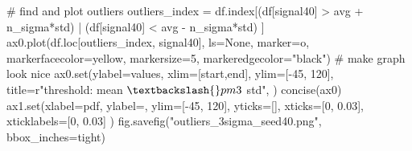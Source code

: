 \documentclass[
  letterpaper,
  DIV=11,
  numbers=noendperiod,
  oneside]{scrreprt}
\newenvironment{Shaded}{\begin{snugshade}}{\end{snugshade}}
\newcommand{\BuiltInTok}[1]{\textcolor[rgb]{0.00,0.23,0.31}{#1}}
\newcommand{\CommentTok}[1]{\textcolor[rgb]{0.37,0.37,0.37}{#1}}
\newcommand{\DecValTok}[1]{\textcolor[rgb]{0.68,0.00,0.00}{#1}}
\newcommand{\FloatTok}[1]{\textcolor[rgb]{0.68,0.00,0.00}{#1}}
\newcommand{\NormalTok}[1]{\textcolor[rgb]{0.00,0.23,0.31}{#1}}
\newcommand{\OperatorTok}[1]{\textcolor[rgb]{0.37,0.37,0.37}{#1}}
\newcommand{\StringTok}[1]{\textcolor[rgb]{0.13,0.47,0.30}{#1}}
\newcommand{\VerbatimStringTok}[1]{\textcolor[rgb]{0.13,0.47,0.30}{#1}}
\begin{document}
\begin{Shaded}
\begin{Highlighting}[]
\CommentTok{\# find and plot outliers}
\NormalTok{outliers\_index }\OperatorTok{=}\NormalTok{ df.index[(df[}\StringTok{\textquotesingle{}signal40\textquotesingle{}}\NormalTok{] }\OperatorTok{\textgreater{}}\NormalTok{ avg }\OperatorTok{+}\NormalTok{ n\_sigma}\OperatorTok{*}\NormalTok{std) }\OperatorTok{|} 
\NormalTok{                          (df[}\StringTok{\textquotesingle{}signal40\textquotesingle{}}\NormalTok{] }\OperatorTok{\textless{}}\NormalTok{ avg }\OperatorTok{{-}}\NormalTok{ n\_sigma}\OperatorTok{*}\NormalTok{std)}
\NormalTok{                         ]}
\NormalTok{ax0.plot(df.loc[outliers\_index, }\StringTok{\textquotesingle{}signal40\textquotesingle{}}\NormalTok{], ls}\OperatorTok{=}\StringTok{\textquotesingle{}None\textquotesingle{}}\NormalTok{,}
\NormalTok{        marker}\OperatorTok{=}\StringTok{\textquotesingle{}o\textquotesingle{}}\NormalTok{, markerfacecolor}\OperatorTok{=}\StringTok{\textquotesingle{}yellow\textquotesingle{}}\NormalTok{, markersize}\OperatorTok{=}\DecValTok{5}\NormalTok{,}
\NormalTok{        markeredgecolor}\OperatorTok{=}\StringTok{"black"}\NormalTok{)}
\CommentTok{\# make graph look nice}
\NormalTok{ax0.}\BuiltInTok{set}\NormalTok{(ylabel}\OperatorTok{=}\StringTok{\textquotesingle{}values\textquotesingle{}}\NormalTok{,}
\NormalTok{       xlim}\OperatorTok{=}\NormalTok{[start,end],}
\NormalTok{       ylim}\OperatorTok{=}\NormalTok{[}\OperatorTok{{-}}\DecValTok{45}\NormalTok{, }\DecValTok{120}\NormalTok{],}
\NormalTok{       title}\OperatorTok{=}\VerbatimStringTok{r"threshold: mean $\textbackslash{}pm3$ std"}\NormalTok{,}
\NormalTok{       )}
\NormalTok{concise(ax0)}
\NormalTok{ax1.}\BuiltInTok{set}\NormalTok{(xlabel}\OperatorTok{=}\StringTok{\textquotesingle{}pdf\textquotesingle{}}\NormalTok{,}
\NormalTok{        ylabel}\OperatorTok{=}\StringTok{\textquotesingle{}\textquotesingle{}}\NormalTok{,}
\NormalTok{        ylim}\OperatorTok{=}\NormalTok{[}\OperatorTok{{-}}\DecValTok{45}\NormalTok{, }\DecValTok{120}\NormalTok{],}
\NormalTok{        yticks}\OperatorTok{=}\NormalTok{[],}
\NormalTok{        xticks}\OperatorTok{=}\NormalTok{[}\DecValTok{0}\NormalTok{, }\FloatTok{0.03}\NormalTok{],}
\NormalTok{        xticklabels}\OperatorTok{=}\NormalTok{[}\StringTok{\textquotesingle{}0\textquotesingle{}}\NormalTok{, }\StringTok{\textquotesingle{}0.03\textquotesingle{}}\NormalTok{]}
\NormalTok{        )}
\NormalTok{fig.savefig(}\StringTok{"outliers\_3sigma\_seed40.png"}\NormalTok{, bbox\_inches}\OperatorTok{=}\StringTok{\textquotesingle{}tight\textquotesingle{}}\NormalTok{)}
\end{Highlighting}
\end{Shaded}
\end{document}
